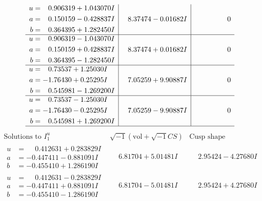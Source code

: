 \documentclass[1p]{elsarticle_modified}
\theoremstyle{definition}
\newcommand{\I}{\sqrt{-1}}
\begin{document}
$$\begin{array}{c|c|c}
\begin{aligned}
u &= \phantom{-}0.906319 + 1.043070 I \\
a &= \phantom{-}0.150159 - 0.428837 I \\
b &= \phantom{-}0.364395 + 1.282450 I\end{aligned}
 & \phantom{-}8.37474 - 0.01682 I & \phantom{-0.000000 } 0 \\ \hline\begin{aligned}
u &= \phantom{-}0.906319 - 1.043070 I \\
a &= \phantom{-}0.150159 + 0.428837 I \\
b &= \phantom{-}0.364395 - 1.282450 I\end{aligned}
 & \phantom{-}8.37474 + 0.01682 I & \phantom{-0.000000 } 0 \\ \hline\begin{aligned}
u &= \phantom{-}0.73537 + 1.25030 I \\
a &= -1.76430 + 0.25295 I \\
b &= \phantom{-}0.545981 - 1.269200 I\end{aligned}
 & \phantom{-}7.05259 + 9.90887 I & \phantom{-0.000000 } 0 \\ \hline\begin{aligned}
u &= \phantom{-}0.73537 - 1.25030 I \\
a &= -1.76430 - 0.25295 I \\
b &= \phantom{-}0.545981 + 1.269200 I\end{aligned}
 & \phantom{-}7.05259 - 9.90887 I & \phantom{-0.000000 } 0\\
 \hline 
 \end{array}$$\newpage$$\begin{array}{c|c|c}  
\text{Solutions to }I^u_{1}& \I (\text{vol} + \sqrt{-1}CS) & \text{Cusp shape}\\
 \hline 
\begin{aligned}
u &= \phantom{-}0.412631 + 0.283829 I \\
a &= -0.447411 - 0.881091 I \\
b &= -0.455410 + 1.286190 I\end{aligned}
 & \phantom{-}6.81704 + 5.01481 I & \phantom{-}2.95424 - 4.27680 I \\ \hline\begin{aligned}
u &= \phantom{-}0.412631 - 0.283829 I \\
a &= -0.447411 + 0.881091 I \\
b &= -0.455410 - 1.286190 I\end{aligned}
 & \phantom{-}6.81704 - 5.01481 I & \phantom{-}2.95424 + 4.27680 I \\ \hline\begin{aligned}

\end{aligned}
\end{array}$$
\end{document}
